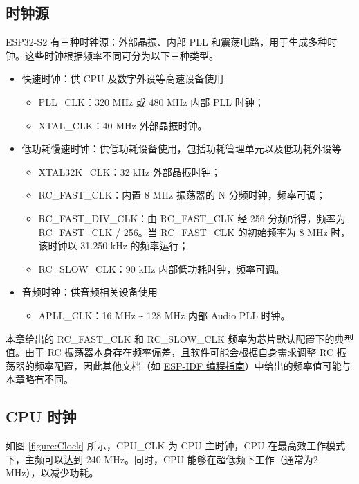 \documentclass[main\_\_CN.tex]{subfiles}
\begin{document}
\subsection{时钟源}
ESP32-S2 有三种时钟源：外部晶振、内部 PLL 和震荡电路，用于生成多种时钟。这些时钟根据频率不同可分为以下三种类型。
\begin{itemize}
    \item 快速时钟：供 CPU 及数字外设等高速设备使用
        \begin{itemize}
            \item PLL\_CLK：320 MHz 或 480 MHz 内部 PLL 时钟；
            \item XTAL\_CLK：40 MHz 外部晶振时钟。
        \end{itemize}
    \item 低功耗慢速时钟：供低功耗设备使用，包括功耗管理单元以及低功耗外设等
        \begin{itemize}
            \item XTAL32K\_CLK：32 kHz 外部晶振时钟；
	        \item RC\_FAST\_CLK：内置 8 MHz 振荡器的 N 分频时钟，频率可调；
	        \item RC\_FAST\_DIV\_CLK：由 RC\_FAST\_CLK 经 256 分频所得，频率为 RC\_FAST\_CLK / 256。当 RC\_FAST\_CLK 的初始频率为 8 MHz 时，该时钟以 31.250 kHz 的频率运行；
	        \item RC\_SLOW\_CLK：90 kHz 内部低功耗时钟，频率可调。
	    \end{itemize}
    \item 音频时钟：供音频相关设备使用
        \begin{itemize}
            \item APLL\_CLK：16 MHz \verb+~+ 128 MHz 内部 Audio PLL 时钟。
	    \end{itemize}
\end{itemize}

\begin{tiplisting}
本章给出的 RC\_FAST\_CLK 和 RC\_SLOW\_CLK 频率为芯片默认配置下的典型值。由于 RC 振荡器本身存在频率偏差，且软件可能会根据自身需求调整 RC 振荡器的频率配置，因此其他文档（如 \href{https://docs.espressif.com/projects/esp-idf/zh_CN/latest/esp32s2/api-reference/peripherals/clk_tree.html}{ESP-IDF 编程指南}）中给出的频率值可能与本章略有不同。
\end{tiplisting}

\subsection{CPU 时钟}
\label{sec:cpu-clock}
如图 \ref{figure:Clock} 所示，CPU\_CLK 为 CPU 主时钟，CPU 在最高效工作模式下，主频可以达到 240 MHz。同时，CPU 能够在超低频下工作（通常为2 MHz），以减少功耗。
\end{document}

